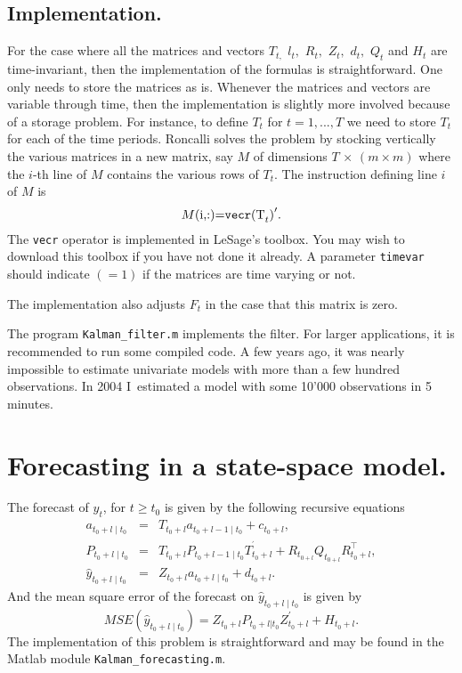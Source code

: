 \documentclass[12pt,a4paper]{article}
\begin{document}
\subsection{Implementation.}

For the case where all the matrices and vectors $T_{t,}$ $l_{t},$ $R_{t},$ $%
Z_{t},$ $d_{t},$ $Q_{t}$ and $H_{t}$ are time-invariant, then the
implementation of the formulas is straightforward. One only needs to store
the matrices as is. Whenever the matrices and vectors are variable through
time, then the implementation is slightly more involved because of a storage
problem. For instance, to define $T_{t}$ for $t=1,...,T$ we need to store $%
T_{t}$ for each of the time periods. Roncalli solves the problem by stocking
vertically the various matrices in a new matrix, say $M$ of dimensions $T$ $%
\times $ $(m\times m)$ where the $i$-th line of $M$ contains the various
rows of $T_{t}$. The instruction defining line $i$ of $M$ is%
\begin{equation*}
M\text{(i,:)=\texttt{vecr}(T}_{t}\text{)}^{\prime }.
\end{equation*}%
The \texttt{vecr} operator is implemented in LeSage's toolbox. You
may wish to download this toolbox if you have not done it already.
A parameter \texttt{timevar} should indicate $(=1)$ if the
matrices are time varying or not.

The implementation also adjusts $F_{t}$ in the case that this matrix is zero.

The program \texttt{Kalman\_filter.m} implements the filter. For larger
applications, it is recommended to run some compiled code. A few years ago,
it was nearly impossible to estimate univariate models with more than a few
hundred observations. In 2004 I\ estimated a model with some 10'000
observations in 5 minutes.

\section{Forecasting in a state-space model.}

The forecast of $y_{t}$, for $t\geqslant t_{0}$ is given by the following
recursive equations%
\begin{eqnarray*}
a_{t_{0}+l\mid t_{0}} &=&T_{t_{0}+l}a_{t_{0}+l-1\mid t_{0}}+c_{t_{0}+l}, \\
P_{t_{0}+l\mid t_{0}} &=&T_{t_{0}+l}P_{t_{0}+l-1\mid
t_{0}}T_{t_{0}+l}^{^{\prime }}+R_{t_{0+l}}Q_{t_{0+l}}R_{t_{0}+l}^{\top }, \\
\widehat{y}_{t_{0}+l\mid t_{0}} &=&Z_{t_{0}+l}a_{t_{0}+l\mid
t_{0}}+d_{t_{0}+l}.
\end{eqnarray*}
And the mean square error of the forecast on
$\widehat{y}_{t_{0}+l\mid
t_{0}} $ is given by%
\begin{equation*}
MSE(\widehat{y}_{t_{0}+l\mid
t_{0}})=Z_{t_{0}+l}P_{t_{0}+l|t_{0}}Z_{t_{0}+l}^{\prime }+H_{t_{0}+l}.
\end{equation*}
The implementation of this problem is straightforward and may be
found in the Matlab module \texttt{Kalman\_forecasting.m}.
\end{document}
